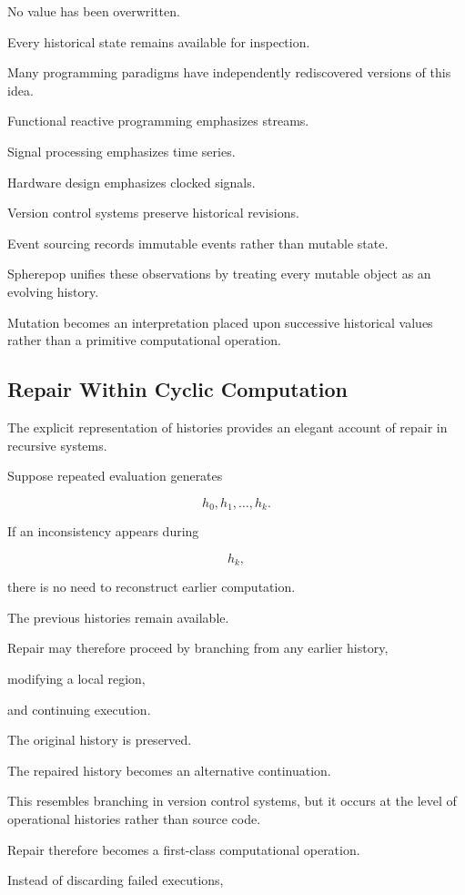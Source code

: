 \documentclass[12pt,oneside]{article}
\begin{document}
No value has been overwritten.

Every historical state remains available for inspection.

Many programming paradigms have independently rediscovered versions of this idea.

Functional reactive programming emphasizes streams.

Signal processing emphasizes time series.

Hardware design emphasizes clocked signals.

Version control systems preserve historical revisions.

Event sourcing records immutable events rather than mutable state.

Spherepop unifies these observations by treating every mutable object as an evolving history.

Mutation becomes an interpretation placed upon successive historical values rather than a primitive computational operation.

\subsection{Repair Within Cyclic Computation}

The explicit representation of histories provides an elegant account of repair in recursive systems.

Suppose repeated evaluation generates

\[
h_0,
h_1,
\ldots,
h_k.
\]

If an inconsistency appears during

\[
h_k,
\]

there is no need to reconstruct earlier computation.

The previous histories remain available.

Repair may therefore proceed by branching from any earlier history,

modifying a local region,

and continuing execution.

The original history is preserved.

The repaired history becomes an alternative continuation.

This resembles branching in version control systems, but it occurs at the level of operational histories rather than source code.

Repair therefore becomes a first-class computational operation.

Instead of discarding failed executions,
\end{document}
